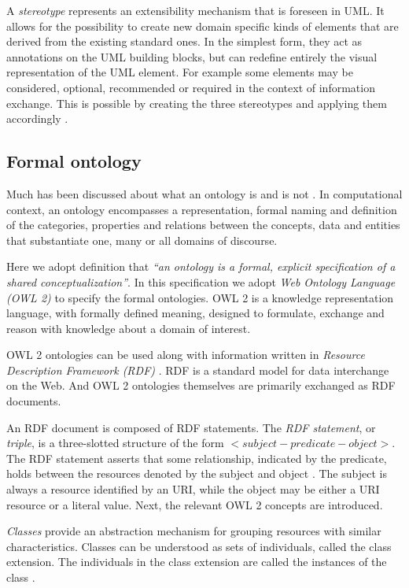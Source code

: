 	A \textit{stereotype} represents an extensibility mechanism that is foreseen in UML. It allows for the possibility to create new domain specific kinds of elements that are derived from the existing standard ones. In the simplest form, they act as annotations on the UML building blocks, but can redefine entirely the visual representation of the UML element. For example some elements may be considered, optional, recommended or required in the context of information exchange. This is possible by creating the three stereotypes and applying them accordingly \cite{uml-userguide}.

\subsection{Formal ontology}
	\label{sec:ontology}

	Much has been discussed about what an ontology is and is not \cite{guarino2009ontology}. In computational context, an ontology encompasses a representation, formal naming and definition of the categories, properties and relations between the concepts, data and entities that substantiate one, many or all domains of discourse.
	
	Here we adopt \citet{studer1998} definition that \textit{``an ontology is a formal, explicit specification of a shared conceptualization''}. In this specification we adopt \textit{Web Ontology Language (OWL 2)} \cite{owl1,owl2,owl2.0} to specify the formal ontologies. OWL 2 is a knowledge representation language, with formally defined meaning, designed to formulate, exchange and reason with knowledge about a domain of interest. 
	
	OWL 2 ontologies can be used along with information written in \textit{Resource Description Framework (RDF)} \cite{rdf11}. RDF is a standard model for data interchange on the Web. And OWL 2 ontologies themselves are primarily exchanged as RDF documents.  
	
	An RDF document is composed of RDF statements. The \textit{RDF statement}, or \textit{triple}, is a three-slotted structure of the form $<subject- predicate-object>$. The RDF statement asserts that some relationship, indicated by the predicate, holds between the resources denoted by the subject and object \cite{rdf11}. The subject is always a resource identified by an URI, while the object may be either a URI resource or a literal value. Next, the relevant OWL 2 concepts are introduced.

	\textit{Classes} provide an abstraction mechanism for grouping resources with similar characteristics. Classes can be understood as sets of individuals, called the class extension. The individuals in the class extension are called the instances of the class \cite{owl1}.

